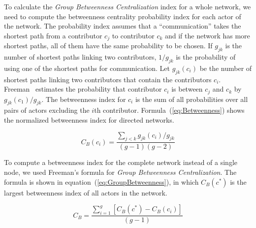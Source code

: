 To calculate the \emph{Group Betweenness Centralization} index for a whole
network, we need to compute the betweenness centrality probability index for each
actor of the network. The probability index assumes that a ``communication''
takes the shortest path from a contributor $c_j$ to contributor $c_k$ and if the
network has more shortest paths, all of them have the same probability to be
chosen. If $g_{jk}$ is the number of shortest paths linking two contributors,
$1/g_{jk}$ is the probability of using one of the shortest paths for
communication. Let $g_{jk}(c_i)$ be the number of shortest paths linking two
contributors that contain the contributors $c_i$. Freeman~\cite{Freeman:1979rl}
estimates the probability that contributor $c_i$ is between $c_j$ and $c_k$ by
$g_{jk}(c_1)/g_{jk}$. The betweenness index for $c_i$ is the sum of all
probabilities over all pairs of actors excluding the $i$th contributor.
Formula~(\ref{eq:Betweenness}) shows the normalized betweenness index for
directed networks.

\begin{equation}
\displaystyle C_B(c_i) =  \frac{\sum_{j<k} g_{jk}(c_i)/g_{jk}}{(g-1)(g-2)}
\label{eq:Betweenness}
\end{equation}

To compute a betweenness index for the complete network instead of a single node,
we used Freeman's formula for \emph{Group Betweenness Centralization}. The
formula is shown in equation~(\ref{eq:GroupBetweenness}), in which $C_B(c^*)$ is
the largest betweenness index of all actors in the network.

\begin{equation}
\displaystyle C_B =  \frac{\sum_{i=1}^g[C_B(c^*)-C_B(c_i)]}{(g-1)}
\label{eq:GroupBetweenness}
\end{equation}


